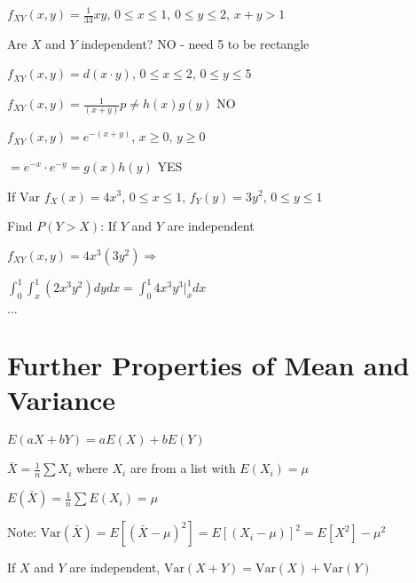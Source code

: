 \begin{example}
$f_{XY}(x,y) = \frac{1}{33} xy$, $0 \leq x \leq 1$, $0 \leq y \leq 2$, $x + y > 1$

Are $X$ and $Y$ independent? NO - need 5 to be rectangle
\end{example}

\begin{example}
$f_{XY}(x,y) = d(x \cdot y)$, $0 \leq x \leq 2$, $0 \leq y \leq 5$

$f_{XY}(x,y) = \frac{1}{(x+y)} p \neq h(x)g(y)$ NO
\end{example}

\begin{example}
$f_{XY}(x,y) = e^{-(x+y)}$, $x \geq 0$, $y \geq 0$

$= e^{-x} \cdot e^{-y} = g(x) h(y)$ YES
\end{example}

\begin{example}
If $\text{Var } f_X(x) = 4x^3$, $0 \leq x \leq 1$, $f_Y(y) = 3y^2$, $0 \leq y \leq 1$

Find $P(Y > X)$: If $Y$ and $Y$ are independent

$f_{XY}(x,y) = 4x^3(3y^2) \Rightarrow$

$\int_0^1 \int_x^1 (2x^3y^2) dy dx = \int_0^1 4x^3 y^3 \Big|_x^1 dx$

$\ldots$
\end{example}

\section{Further Properties of Mean and Variance}

\begin{lemma}
$E(aX + bY) = aE(X) + bE(Y)$
\end{lemma}

\begin{definition}
$\bar{X} = \frac{1}{n} \sum X_i$ where $X_i$ are from a list with $E(X_i) = \mu$

$E(\bar{X}) = \frac{1}{n} \sum E(X_i) = \mu$

$\text{Note: } \text{Var}(\bar{X}) = E[(\bar{X}-\mu)^2] = E[(X_i - \mu)]^2 = E[X^2] - \mu^2$
\end{definition}

\begin{note}
If $X$ and $Y$ are independent, $\text{Var}(X+Y) = \text{Var}(X) + \text{Var}(Y)$
\end{note}

